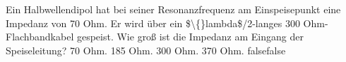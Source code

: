     {Ein Halbwellendipol hat bei seiner Resonanzfrequenz am Einspeisepunkt eine Impedanz von 70 Ohm. Er wird über ein \$\textbackslash\{\}lambda\$/2-langes 300 Ohm-Flachbandkabel gespeist. Wie groß ist die Impedanz am Eingang der Speiseleitung?}
    {70 Ohm.}
    {185 Ohm.}
    {300 Ohm.}
    {370 Ohm.}
    {false}{false}